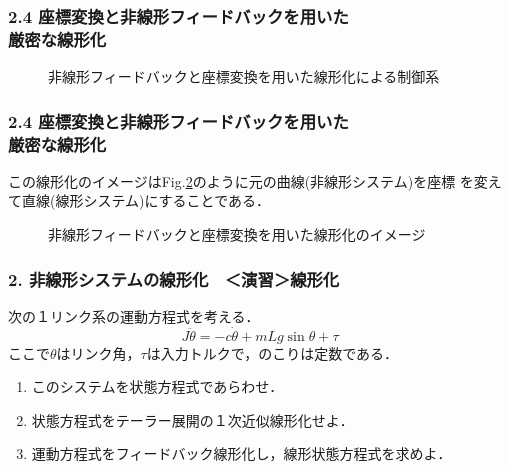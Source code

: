 \begin{frame}[t]
\frametitle{2.4 座標変換と非線形フィードバックを用いた\\
厳密な線形化}
\begin{figure}[htbp]
 \begin{center}
 	\scalebox{0.7}{
  	
	}
  \caption{非線形フィードバックと座標変換を用いた線形化による制御系}
  \label{config_lin_w_fd_cor}
 \end{center}
\end{figure}
\end{frame}


\begin{frame}[t]
\frametitle{2.4 座標変換と非線形フィードバックを用いた\\
厳密な線形化}
この線形化のイメージはFig.\ref{image_lin_w_fb_cor}のように元の曲線(非線形システム)を座標
を変えて直線(線形システム)にすることである．

\begin{figure}[htbp]
 \begin{center}
 	\scalebox{0.7}{
  }
  \caption{非線形フィードバックと座標変換を用いた線形化のイメージ}
  \label{image_lin_w_fb_cor}
 \end{center}
\end{figure}

\end{frame}

\begin{frame}[t]
\frametitle{2. 非線形システムの線形化　＜演習＞線形化}
次の１リンク系の運動方程式を考える．
\[
	J \ddot{\theta} = -c \dot{\theta} + mLg \sin \theta + \tau
\]\nopagebreak
ここで$\theta$はリンク角，$\tau$は入力トルクで，のこりは定数である．

\begin{enumerate}
\item 
このシステムを状態方程式であらわせ．
\item
状態方程式をテーラー展開の１次近似線形化せよ．
\item
運動方程式をフィードバック線形化し，線形状態方程式を求めよ．
\end{enumerate}
\end{frame}



